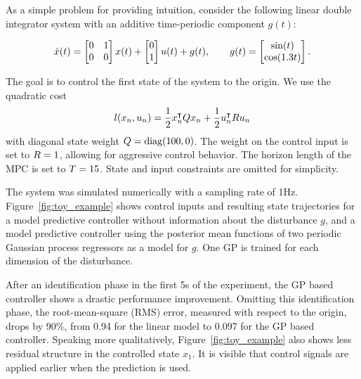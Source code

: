 As a simple problem for providing intuition, consider the following linear
double integrator system with an additive time-periodic component $g(t)$:
\begin{fullwidth}\vspace{-\baselineskip}
\begin{equation}
\label{eq:toy-dynamics}
  \dot x(t) = \begin{bmatrix}0 & 1 \\ 0 & 0 \end{bmatrix}
  x(t) + \begin{bmatrix}0 \\ 1 \end{bmatrix} u(t) + g(t),
\qq
 g(t) = \begin{bmatrix}\sin(t) \\ \cos(1.3 t) \end{bmatrix}.
\end{equation}
\end{fullwidth}
The goal is to control the first state of the system to the origin. We use the
quadratic cost
\begin{equation}
  l(x_n,u_n) = \frac{1}{2} x_{n}^{\intercal} Q x_{n} + \frac{1}{2} u_n^{\intercal}
  R u_n
\end{equation}
with diagonal state weight $Q = \operatorname{diag}(100, 0)$.
The weight on the control input is set to $R=1$, allowing for
aggressive control behavior. The horizon length of the MPC is set to $T = 15$.
State and input constraints are omitted for simplicity.

The system was simulated numerically with a sampling rate of 1\unit{Hz}.
Figure~\ref{fig:toy_example} shows control inputs and resulting state
trajectories for a model predictive controller without information about the
disturbance $g$, and a model predictive controller using the posterior mean
functions of two periodic Gaussian process regressors as a model for $g$. One
GP is trained for each dimension of the disturbance.

After an identification phase in the first 5\unit{s} of the experiment, the GP
based controller shows a drastic performance improvement. Omitting this
identification phase, the root-mean-square (RMS) error, measured with respect
to the origin, drops by 90\unit{\%}, from 0.94 for the linear model to 0.097
for the GP based controller. Speaking more qualitatively,
Figure~\ref{fig:toy_example} also shows less residual structure in the
controlled state $x_1$. It is visible that control signals are applied earlier
when the prediction is used.

